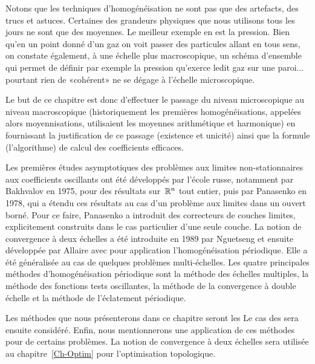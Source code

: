\medskip{}
Notons que les techniques d'homogénéisation ne sont pas que des artefacts, des trucs et astuces.
Certaines des grandeurs physiques que nous utilisons tous les jours ne sont que des moyennes. Le meilleur exemple en est la pression. Bien qu'en un point donné d'un gaz on voit passer des particules allant en tous sens, on constate également, à une échelle plus macroscopique, un schéma d'ensemble qui permet de définir par exemple la pression qu'exerce ledit gaz sur une paroi... pourtant rien de «cohérent» ne se dégage à l'échelle microscopique.

\medskip
Le but de ce chapitre est donc d'effectuer le passage du niveau microscopique au niveau macroscopique (historiquement les premières homogénéisations, appelées alors moyennisations, utilisaient les moyennes arithmétique et harmonique) en fournissant la justification de ce passage (existence et unicité) ainsi que la formule (l'algorithme) de calcul des coefficients efficaces.

\medskip
Les premières études asymptotiques des problèmes aux limites non-stationnaires aux coefficients oscillants ont été développés par l'école russe, notamment par Bakhvalov en 1975, pour des résultats sur~$\mathbb R^n$ tout entier, puis par Panasenko en 1978, qui a étendu ces résultats au cas d'un problème aux limites dans un ouvert borné. Pour ce faire, Panasenko a introduit des correcteurs de couches limites, explicitement construits dans le cas particulier d'une seule couche.
La notion de convergence à deux échelles a été introduite en 1989 par Nguetseng et ensuite développée par Allaire avec pour application l'homogénéisation périodique. Elle a été généralisée au cas de quelques problèmes multi-échelles.
Les quatre principales méthodes d'homogénéisation périodique sont la méthode des échelles multiples, la méthode des fonctions tests oscillantes, la méthode de la convergence à double échelle et la méthode de l'éclatement périodique.
 
\medskip
Les méthodes que nous présenterons dans ce chapitre seront les  Le cas des  sera ensuite considéré. Enfin, nous mentionnerons une application de ces méthodes pour  de certains problèmes. La notion de convergence à deux échelles sera utilisée au chapitre~\ref{Ch-Optim} pour l'optimisation topologique.

